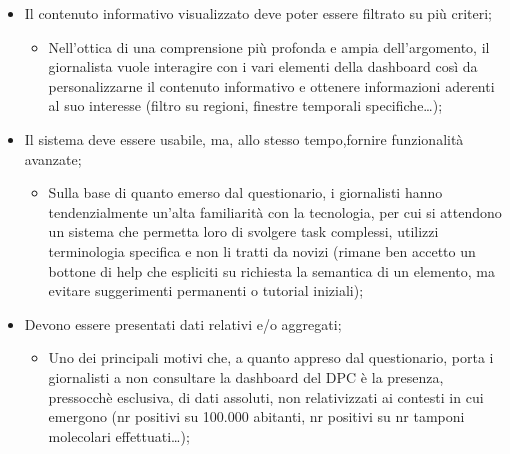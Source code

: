 \begin{itemize}
	\item Il contenuto informativo visualizzato deve poter essere filtrato su più criteri;
	\begin{itemize}
        \item Nell'ottica di una comprensione più profonda e ampia dell'argomento, il giornalista vuole interagire con i vari elementi della dashboard così da personalizzarne il contenuto informativo e ottenere informazioni aderenti al suo interesse (filtro su regioni, finestre temporali specifiche…);
    \end{itemize}
	\item Il sistema deve essere usabile, ma, allo stesso tempo,fornire funzionalità avanzate;
	\begin{itemize}
        \item Sulla base di quanto emerso dal questionario, i giornalisti hanno tendenzialmente un'alta familiarità con la tecnologia, per cui si attendono un sistema che permetta loro di svolgere task complessi, utilizzi terminologia specifica e non li tratti da novizi (rimane ben accetto un bottone di help che espliciti su richiesta la semantica di un elemento, ma evitare suggerimenti permanenti o tutorial iniziali);
    \end{itemize}
	\item Devono essere presentati dati relativi e/o aggregati;
	\begin{itemize}
        \item Uno dei principali motivi che, a quanto appreso dal questionario, porta i giornalisti a non consultare la dashboard del DPC è la presenza, pressocchè esclusiva, di dati assoluti, non relativizzati ai contesti in cui emergono (nr positivi su 100.000 abitanti, nr positivi su nr tamponi molecolari effettuati…);
    \end{itemize}
\end{itemize}
